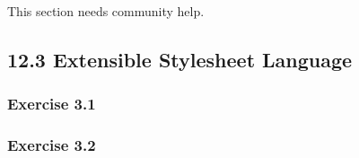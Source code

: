 \documentclass[../../main.tex]{subfiles}
\begin{document}
This section needs community help.

\subsection{12.3 Extensible Stylesheet Language}

\subsubsection*{Exercise 3.1}

\subsubsection*{Exercise 3.2}
\end{document}
